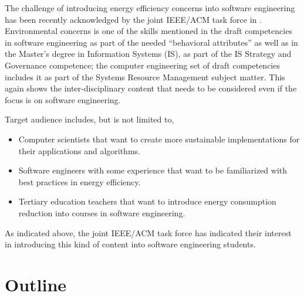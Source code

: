 \documentclass[a4paper]{article}
\begin{document}
The challenge of introducing energy efficiency concerns into software
engineering has been recently acknowledged by the joint IEEE/ACM task force in
\cite{cc2020}. Environmental concerns is one of the skills mentioned in the
draft competencies in software engineering as part of the needed ``behavioral
attributes'' as well as in the Master's degree in Information Systems (IS), as
part of the IS Strategy and Governance competence; the computer engineering set
of draft competencies includes it as part of the Systems Resource Management
subject matter. This again shows the inter-disciplinary content that needs to be
considered even if the focus is on software engineering.

Target audience includes, but is not limited to, \begin{itemize}
  \item Computer scientists that want to create more sustainable implementations
    for their applications and algorithms.
  \item Software engineers with some experience that want to be familiarized
    with best practices in energy efficiency.
    \item Tertiary education teachers that want to introduce energy consumption
      reduction into courses in software engineering.
\end{itemize} 

As indicated above, the joint IEEE/ACM task force has indicated their interest
in introducing this kind of content into software engineering students.

\section{Outline}
\end{document}
